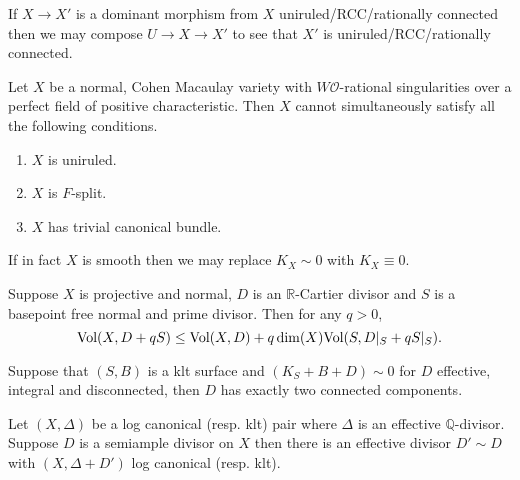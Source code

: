 If $X \to X'$ is a dominant morphism from $X$ uniruled/RCC/rationally connected then we may compose $U \to X \to X'$ to see that $X'$ is uniruled/RCC/rationally connected. 

\begin{theorem}\cite[Theorem 1.2]{patakfalvi2019ordinary}\label{split}
	Let $X$ be a normal, Cohen Macaulay variety with $W\mathcal{O}$-rational singularities over a perfect field of positive characteristic. Then $X$ cannot simultaneously satisfy all the following conditions.
	\begin{enumerate}
		\item $X$ is uniruled.
		\item $X$ is $F$-split.
		\item $X$ has trivial canonical bundle.
	\end{enumerate}
	If in fact $X$ is smooth then we may replace $K_{X}\sim 0$ with $K_{X} \equiv 0$.
\end{theorem}

\begin{lemma}\label{vol}\cite[Lemma 2.5]{jiang2018birational}
	Suppose $X$ is projective and normal, $D$ is an $\mathbb{R}$-Cartier divisor and $S$ is a basepoint free normal and prime divisor. Then for any $q >0$,
	\[\text{Vol}(X,D+qS) \leq \text{Vol}(X,D) + q\dim(X)\text{Vol}(S,D|_{S}+qS|_{S}).\]
\end{lemma}	

\begin{lemma}\label{cc} \cite[Proposition 4.37]{kk-singbook}
	Suppose that $(S,B)$ is a klt surface and $(K_{S}+B+D) \sim 0$ for $D$ effective, integral and disconnected, then $D$ has exactly two connected components.
\end{lemma}

\begin{theorem}\cite[Theorem 1]{tanaka2017semiample}
	Let $(X,\Delta)$ be a log canonical (resp. klt) pair where $\Delta$ is an effective $\mathbb{Q}$-divisor. Suppose $D$ is a semiample divisor on $X$ then there is an effective divisor $D'\sim D$ with $(X,\Delta+D')$ log canonical (resp. klt).
\end{theorem}

